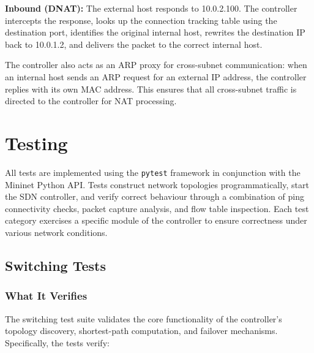 \documentclass[12pt,a4paper]{article}
\begin{document}
\textbf{Inbound (DNAT):} The external host responds to 10.0.2.100. The controller intercepts the response, looks up the connection tracking table using the destination port, identifies the original internal host, rewrites the destination IP back to 10.0.1.2, and delivers the packet to the correct internal host.

The controller also acts as an ARP proxy for cross-subnet communication: when an internal host sends an ARP request for an external IP address, the controller replies with its own MAC address. This ensures that all cross-subnet traffic is directed to the controller for NAT processing.

\section{Testing}

All tests are implemented using the \texttt{pytest} framework in conjunction with the Mininet Python API. Tests construct network topologies programmatically, start the SDN controller, and verify correct behaviour through a combination of ping connectivity checks, packet capture analysis, and flow table inspection. Each test category exercises a specific module of the controller to ensure correctness under various network conditions.

\subsection{Switching Tests}

\subsubsection{What It Verifies}

The switching test suite validates the core functionality of the controller's topology discovery, shortest-path computation, and failover mechanisms. Specifically, the tests verify:
\end{document}
